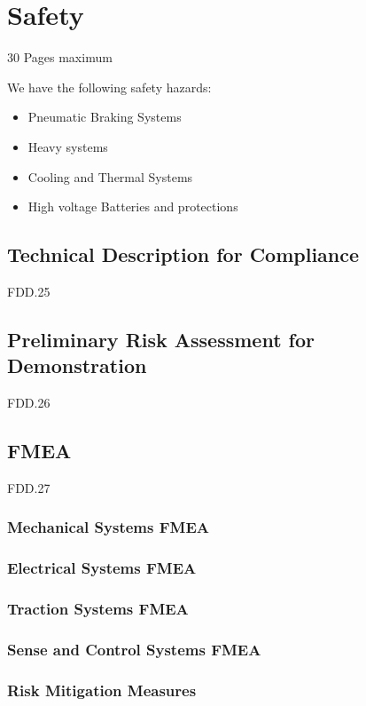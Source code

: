 \chapter{Safety}
30 Pages maximum


We have the following safety hazards:
\begin{itemize}
    \item Pneumatic Braking Systems
    \item Heavy systems
    \item Cooling and Thermal Systems 
    \item High voltage Batteries and protections
\end{itemize}

\section{Technical Description for Compliance}
FDD.25 

\section{Preliminary Risk Assessment for Demonstration}
FDD.26 

\section{FMEA}
FDD.27
\subsection{Mechanical Systems FMEA}
\subsection{Electrical Systems FMEA}
\subsection{Traction Systems FMEA}
\subsection{Sense and Control Systems FMEA}
\subsection{Risk Mitigation Measures}

